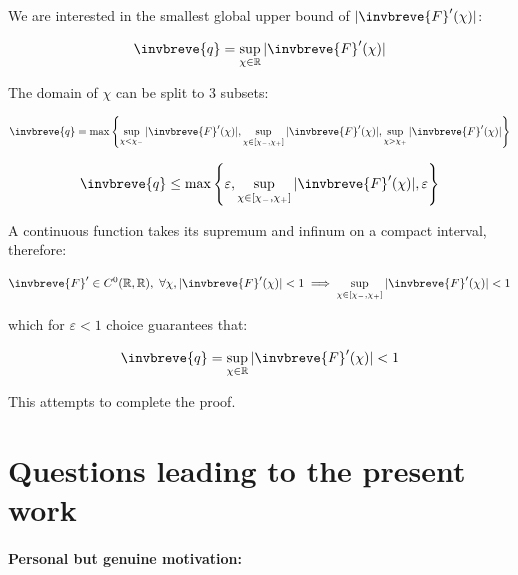 \documentclass{article}
\theoremstyle{definition}
\begin{document}
We are interested in the smallest global upper bound of $|\invbreve{F}'(\chi)|$:

\begin{equation}
    \invbreve{q} = \sup_{\chi \in \mathbb{R}} |\invbreve{F}'(\chi)|
\end{equation}

The domain of $\chi$ can be split to $3$ subsets:

\begin{equation}
    \invbreve{q} = \max \left \{
    \sup_{\chi < \chi_{-}} |\invbreve{F}'(\chi)|,
    \sup_{\chi \in [\chi_{-},\chi_{+}]} |\invbreve{F}'(\chi)|,
    \sup_{\chi > \chi_{+}} |\invbreve{F}'(\chi)|
    \right \}
\end{equation}

\begin{equation}
    \invbreve{q} \le \max \left \{
    \varepsilon,
    \sup_{\chi \in [\chi_{-},\chi_{+}]} |\invbreve{F}'(\chi)|,
    \varepsilon
    \right \}
\end{equation}

A continuous function takes its supremum and infinum on a compact interval, therefore:

\begin{equation}
    \invbreve{F}' \in C^0(\mathbb{R},\mathbb{R}), \ \forall \chi, |\invbreve{F}'(\chi)|<1 \implies 
    \sup_{\chi \in [\chi_{-},\chi_{+}]} |\invbreve{F}'(\chi)| < 1
\end{equation}

which for $\varepsilon<1$ choice guarantees that:

\begin{equation}
    \invbreve{q} = \sup_{\chi \in \mathbb{R}} |\invbreve{F}'(\chi)| < 1
\end{equation}


This attempts to complete the proof.

\begin{flushright}
\end{flushright}

\section{Questions leading to the present work}
\label{Appendix:PersonalMotivation}

\paragraph{Personal but genuine motivation:}
\end{document}
